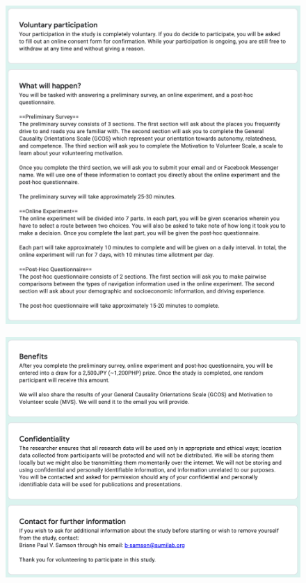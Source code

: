 \begin{figure}[h]
  \centering
  \includegraphics[scale=0.6]{figures/d-info2.png}
\end{figure}

\begin{figure}[h]
  \centering
  \includegraphics[scale=0.6]{figures/d-info3.png}
\end{figure}

